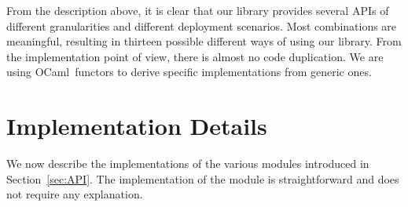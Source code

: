 \documentclass{llncs}
\newcommand{\Ocaml}{OCaml}
\begin{document}
From  the description above, it is clear that our library provides
several APIs of different granularities and different
deployment scenarios. 
Most combinations are meaningful, resulting in
thirteen possible different ways of using our library.
From the implementation point of view, there is almost no code
duplication. We are using \Ocaml\ functors to derive specific
implementations from generic ones.

\section{Implementation Details}\label{sec:implem}

We now describe the implementations of the various modules introduced
in Section~\ref{sec:API}. The implementation of the 
module is straightforward and does not require any explanation.
\end{document}
